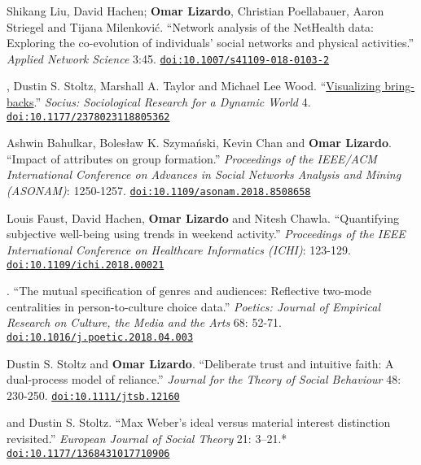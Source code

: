 
\ind Shikang Liu, David Hachen; {\bf Omar Lizardo}, Christian Poellabauer, Aaron Striegel and Tijana Milenkovi\'{c}. ``Network analysis of the NetHealth data: Exploring the co-evolution of individuals' social networks and physical activities.'' {\em Applied Network Science} 3:45. 
\newline
\href{https://doi.org/10.1007/s41109-018-0103-2}{\nolinkurl{doi:10.1007/s41109-018-0103-2}}

, Dustin S. Stoltz, Marshall A. Taylor and Michael Lee Wood. ``\href{}{Visualizing bring-backs}.'' {\em Socius: Sociological Research for a Dynamic World} 4. \href{https://doi.org/10.1177/2378023118805362}{\nolinkurl{doi:10.1177/2378023118805362}}

\ind Ashwin Bahulkar, Boles\l{}aw K. Szyma\'{n}ski, Kevin Chan and {\bf Omar Lizardo}. ``Impact of attributes on group formation.'' {\em Proceedings of the IEEE/ACM International Conference on Advances in Social Networks Analysis and Mining (ASONAM)}: 1250-1257. \href{https://doi.org/10.1109/asonam.2018.8508658}{\nolinkurl{doi:10.1109/asonam.2018.8508658}} 

\ind Louis Faust, David Hachen, {\bf Omar Lizardo} and Nitesh Chawla. ``Quantifying subjective well-being using trends in weekend activity.'' {\em Proceedings of the IEEE International Conference on Healthcare Informatics (ICHI)}: 123-129. \href{https://doi.org/10.1109/ichi.2018.00021}{\nolinkurl{doi:10.1109/ichi.2018.00021}}

. ``The mutual specification of genres and audiences: Reflective two-mode centralities in person-to-culture choice data.'' {\em Poetics: Journal of Empirical Research on Culture, the Media and the Arts} 68: 52-71. \href{https://doi.org/10.1016/j.poetic.2018.04.003}{\nolinkurl{doi:10.1016/j.poetic.2018.04.003}}

\ind Dustin S. Stoltz and {\bf Omar Lizardo}. ``Deliberate trust and intuitive faith: A dual-process model of reliance.'' {\em Journal for the Theory of Social Behaviour} 48: 230-250. \href{https://doi.org/10.1111/jtsb.12160}{\nolinkurl{doi:10.1111/jtsb.12160}}

 and Dustin S. Stoltz. ``Max Weber's ideal versus material interest distinction revisited.'' {\em European Journal of Social Theory} 21: 3–21.\textcolor{uclablue}{*} \href{https://doi.org/10.1177/1368431017710906}{\nolinkurl{doi:10.1177/1368431017710906}}